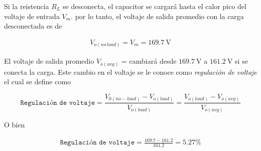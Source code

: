 \documentclass{article}
\begin{document}
\noindent Si la reistencia $R_L$ se desconecta, el capacitor se cargará hasta el calor pico del voltaje de entrada $V_m$. por lo tanto, el voltaje de salida promedio con la carga desconectada es de

\begin{align}
	V_{o (no \, load)} = V_m = \qty{169.7}{\volt}
\end{align}

\noindent El voltaje de salida promedio $V_{o(avg)}$ = cambiará desde $\qty{169.7}{\volt}$ a $\qty{161.2}{\volt}$ si se conecta la carga. Este cambio en el voltaje se le conoce como \textit{regulación de voltaje} el cual se define como

\begin{tcolorbox}[colback=red!5!white,colframe=red!75!black,arc=0mm,boxrule=0mm,width=(\linewidth+0.5cm)]
	\begin{equation}
		\texttt{Regulación de voltaje} = \frac{V_{0(no-load)} - V_{o(load)}}{V_{o(load)}} = \frac{V_{o(load)} - V_{o(avg)}}{V_{o(avg)}}
	\end{equation}
\end{tcolorbox}

O bien

\begin{align}
	\texttt{Regulación de voltaje} = \frac{169.7 - 161.2}{161.2} = 5.27\% \nonumber
\end{align}
\end{document}
